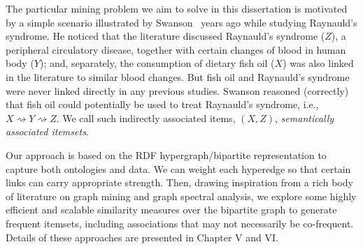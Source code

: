 \begin{enumerate}

    The particular mining problem we aim to solve in this dissertation is motivated by a simple scenario illustrated by Swanson~\cite{swanson87} years ago while studying Raynauld's syndrome.  He noticed that the literature discussed Raynauld's syndrome ($Z$), a peripheral circulatory disease, together with certain changes of blood in human body ($Y$); and, separately, the consumption of dietary fish oil ($X$) was also linked in the literature to similar blood changes.  But fish oil and Raynauld's syndrome were never linked directly in any previous studies.  Swanson reasoned (correctly) that fish oil could potentially be used to treat Raynauld's syndrome, i.e., $X\rightsquigarrow Y \rightsquigarrow Z$. We call such indirectly associated items, $(X,Z)$, \emph{semantically associated itemsets}.

    Our approach is based on the RDF hypergraph/bipartite representation to capture both ontologies and data. We can weight each hyperedge so that certain links can carry appropriate strength. Then, drawing inspiration from a rich body of literature on graph mining and graph spectral analysis, we explore some highly efficient and scalable similarity measures over the bipartite graph to generate frequent itemsets, including associations that may not necessarily be co-frequent. Details of these approaches are presented in Chapter V and VI.

\end{enumerate}

